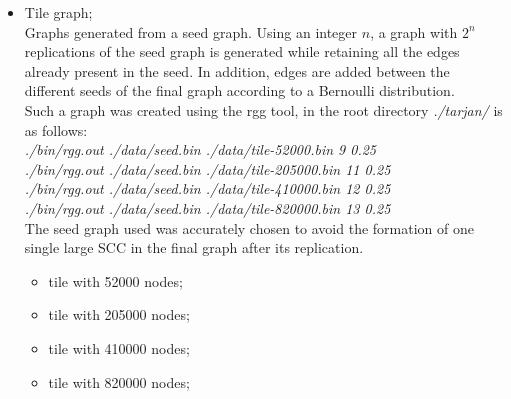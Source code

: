 \begin{itemize}
    \item Tile graph;
    \\Graphs generated from a seed graph. Using an integer $n$, a graph with $2^n$ replications of the seed graph is generated while retaining all the edges already present in the seed. In addition, edges are added between the different seeds of the final graph according to a Bernoulli distribution.
    \\Such a graph was created using the rgg tool, in the root directory \textit{./tarjan/} is as follows: 
    \\\textit{./bin/rgg.out ./data/seed.bin ./data/tile-52000.bin 9 0.25}
    \\\textit{./bin/rgg.out ./data/seed.bin ./data/tile-205000.bin 11 0.25}
    \\\textit{./bin/rgg.out ./data/seed.bin ./data/tile-410000.bin 12 0.25}
    \\\textit{./bin/rgg.out ./data/seed.bin ./data/tile-820000.bin 13 0.25}
    \\The seed graph used was accurately chosen to avoid the formation of one single large SCC in the final graph after its replication.
    \begin{itemize}
      \item tile with 52000 nodes;
      \item tile with 205000 nodes;
      \item tile with 410000 nodes;
      \item tile with 820000 nodes;
    \end{itemize}
    
\end{itemize}
